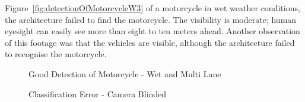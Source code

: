 \documentclass[12pt]{report} %
\begin{document}
		Figure~\ref{fig:detectionOfMotorcycleW3} of a motorcycle in wet weather conditions, the architecture failed to find the motorcycle. The visibility is moderate; human eyesight can easily see more than eight to ten meters ahead. Another observation of this footage was that the vehicles are visible, although the architecture failed to recognise the motorcycle.
		\begin{figure}[hb]
			\begin{floatrow}
				{
					\caption{Good Detection of Motorcycle - Wet and Multi Lane}
					\label{fig:detectionOfMotorcycleW1}
				}
			
				{
					\caption{Classification Error - Camera Blinded}
					\label{fig:detectionOfMotorcycleW2}
				}
			

\end{floatrow}
\end{figure}
\end{document}
